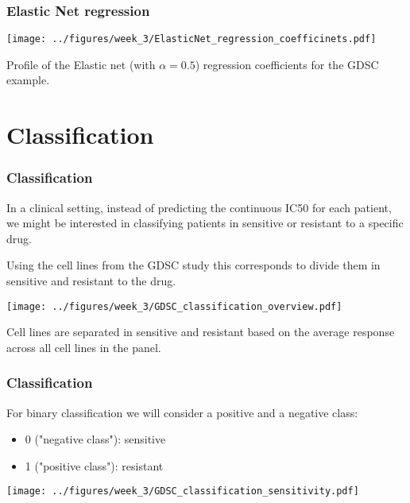 \documentclass[notes]{beamer}          %
\begin{document}
\begin{frame}
\frametitle{Elastic Net regression}

\begin{center}
\texttt{[image: ../figures/week\_3/ElasticNet\_regression\_coefficinets.pdf]}
\end{center}

Profile of the Elastic net (with $\alpha=0.5$) regression coefficients for the GDSC example.

\end{frame}

\section{Classification}

\begin{frame}
\frametitle{Classification}
In a clinical setting, instead of predicting the continuous IC50 for each patient, we might be interested in classifying patients in sensitive or resistant to a specific drug.

\vspace{5mm} 

Using the cell lines from the GDSC study this corresponds to divide them in sensitive and resistant to the drug. 

\begin{center}
\texttt{[image: ../figures/week\_3/GDSC\_classification\_overview.pdf]}
\end{center}

Cell lines are separated in sensitive and resistant based on the average response across all cell lines in the panel.

\end{frame}

\begin{frame}
\frametitle{Classification}

For binary classification we will consider a positive and a negative class:

\begin{itemize}
    \item 0 ("negative class"): sensitive
    \item 1 ("positive class"): resistant
\end{itemize}

\begin{center}
\texttt{[image: ../figures/week\_3/GDSC\_classification\_sensitivity.pdf]}
\end{center}
\end{frame}
\end{document}
